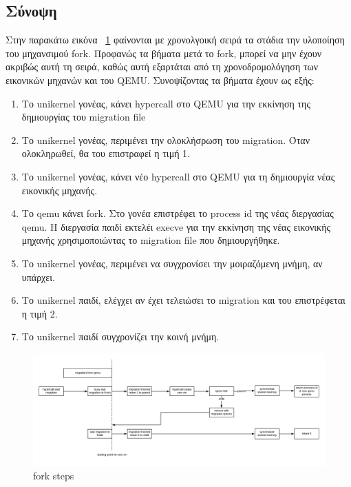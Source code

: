 \subsection{Σύνοψη}

Στην παρακάτω εικόνα ~\ref{fig4_11} φαίνονται με χρονολγοική σειρά τα στάδια
την υλοποίηση του μηχανσιμού fork. Προφανώς τα βήματα μετά το fork, μπορεί να
μην έχουν ακριβώς αυτή τη σειρά, καθώς αυτή εξαρτάται από τη χρονοδρομολόγηση
των εικονικών μηχανών και του QEMU. Συνοψίζοντας τα βήματα έχουν ως εξής:
\begin{enumerate}
	\item Το unikernel γονέας, κάνει hypercall στο QEMU για την εκκίνηση της
		δημιουργίας του migration file 
	\item Το unikernel γονέας, περιμένει την ολοκλήσρωση του migration. Όταν
		ολοκληρωθεί, θα του επιστραφεί η τιμή 1.
	\item Το unikernel γονέας, κάνει νέο hypercall στο QEMU για τη
		δημιουργία νέας εικονικής μηχανής. 
	\item Το qemu κάνει fork. Στο γονέα επιστρέφει το process id της νέας
		διεργασίας qemu. Η διεργασία παιδί εκτελέι execve για την
		εκκίνηση της νέας εικονικής μηχανής χρησιμοποιώντας το migration
		file που δημιουργήθηκε. 
	\item Το unikernel γονέας, περιμένει να συγχρονίσει την μοιραζόμενη
		μνήμη, αν υπάρχει.
	\item Το unikernel παιδί, ελέγχει αν έχει τελειώσει το migration και του
		επιστρέφεται η τιμή 2.
	\item Το unikernel παιδί συγχρονίζει την κοινή μνήμη.
\end{enumerate}

\begin{figure}[htp]
\centerline{\includegraphics[scale=0.6]{figures/fork_timeline.png}}
\caption{fork steps\label{fig4_11}}
\end{figure}

